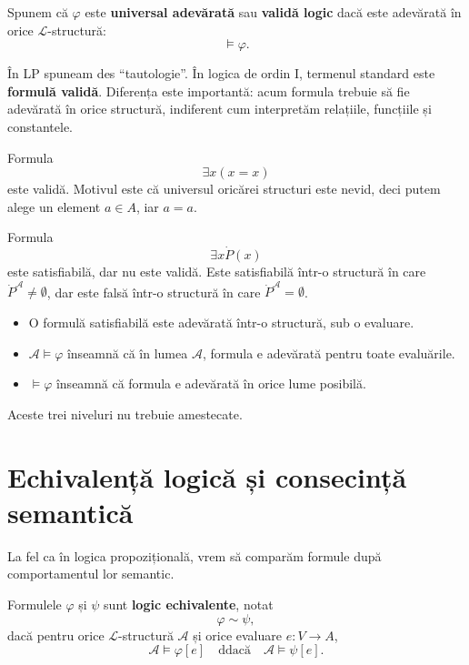 \begin{definition}
	Spunem că \( \varphi \) este \textbf{universal adevărată} sau \textbf{validă logic} dacă este adevărată în orice \( \mathcal{L} \)-structură:
	\[
		\models \varphi.
	\]
\end{definition}

\begin{note}
	În LP spuneam des ``tautologie''. În logica de ordin I, termenul standard este \textbf{formulă validă}. Diferența este importantă: acum formula trebuie să fie adevărată
	în orice structură, indiferent cum interpretăm relațiile, funcțiile și constantele.
\end{note}

\begin{eg}
	Formula
	\[
		\exists x(x=x)
	\]
	este validă. Motivul este că universul oricărei structuri este nevid, deci putem alege un element \(a \in A\), iar \(a=a\).

	Formula
	\[
		\exists x \dot{P}(x)
	\]
	este satisfiabilă, dar nu este validă. Este satisfiabilă într-o structură în care \( \dot{P}^{\mathcal{A}} \neq \emptyset \), dar este falsă într-o structură în care
	\( \dot{P}^{\mathcal{A}} = \emptyset \).
\end{eg}

\begin{note}
	\begin{itemize}
		\item O formulă satisfiabilă este adevărată într-o structură, sub o evaluare.
		\item \( \mathcal{A} \models \varphi \) înseamnă că în lumea \( \mathcal{A} \), formula e adevărată pentru toate evaluările.
		\item \( \models \varphi \) înseamnă că formula e adevărată în orice lume posibilă.
	\end{itemize}

	Aceste trei niveluri nu trebuie amestecate.
\end{note}

\section{Echivalență logică și consecință semantică}

La fel ca în logica propozițională, vrem să comparăm formule după comportamentul lor semantic.

\begin{definition}
	Formulele \( \varphi \) și \( \psi \) sunt \textbf{logic echivalente}, notat
	\[
		\varphi \sim \psi,
	\]
	dacă pentru orice \( \mathcal{L} \)-structură \( \mathcal{A} \) și orice evaluare \(e : V \to A\),
	\[
		\mathcal{A} \models \varphi[e] \quad \text{ddacă} \quad \mathcal{A} \models \psi[e].
	\]
\end{definition}

